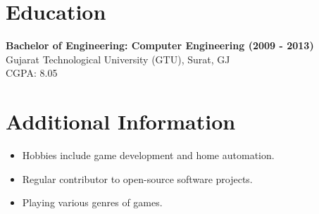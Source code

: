 \documentclass[10pt,a4paper]{article}
\begin{document}
\section*{Education}
\textbf{Bachelor of Engineering: Computer Engineering (2009 - 2013)} \\
Gujarat Technological University (GTU), Surat, GJ \\
CGPA: 8.05

\section*{Additional Information}
\begin{itemize}[leftmargin=*]
  \item Hobbies include game development and home automation.
  \item Regular contributor to open-source software projects.
  \item Playing various genres of games.
\end{itemize}
\end{document}

